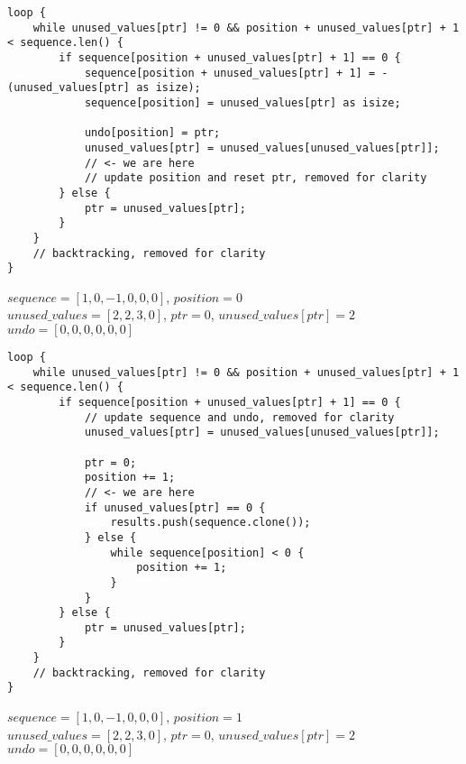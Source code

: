 \begin{frame}[fragile]
    \begin{verbatim}
loop {
    while unused_values[ptr] != 0 && position + unused_values[ptr] + 1 < sequence.len() {
        if sequence[position + unused_values[ptr] + 1] == 0 {
            sequence[position + unused_values[ptr] + 1] = -(unused_values[ptr] as isize);
            sequence[position] = unused_values[ptr] as isize;

            undo[position] = ptr;
            unused_values[ptr] = unused_values[unused_values[ptr]];
            // <- we are here
            // update position and reset ptr, removed for clarity
        } else {
            ptr = unused_values[ptr];
        }
    }
    // backtracking, removed for clarity
}
    \end{verbatim}
    $sequence = [1, 0, -1, 0, 0, 0]$, $position = 0$\\
    $unused\_values = [2, 2, 3, 0]$, $ptr = 0$, $unused\_values[ptr] = 2$\\
    $undo = [0, 0, 0, 0, 0, 0]$
\end{frame}
\begin{frame}[fragile]
    \begin{verbatim}
loop {
    while unused_values[ptr] != 0 && position + unused_values[ptr] + 1 < sequence.len() {
        if sequence[position + unused_values[ptr] + 1] == 0 {
            // update sequence and undo, removed for clarity
            unused_values[ptr] = unused_values[unused_values[ptr]];

            ptr = 0;
            position += 1;
            // <- we are here
            if unused_values[ptr] == 0 {
                results.push(sequence.clone());
            } else {
                while sequence[position] < 0 {
                    position += 1;
                }
            }
        } else {
            ptr = unused_values[ptr];
        }
    }
    // backtracking, removed for clarity
}
    \end{verbatim}
    $sequence = [1, 0, -1, 0, 0, 0]$, $position = 1$\\
    $unused\_values = [2, 2, 3, 0]$, $ptr = 0$, $unused\_values[ptr] = 2$\\
    $undo = [0, 0, 0, 0, 0, 0]$
\end{frame}
